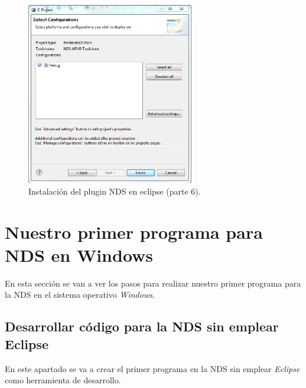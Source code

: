 \newpage

\begin{figure}[h]
\centering
\includegraphics[height=8cm]{./Figuras/C2/c2_instalar_windows8.png}
\caption{Instalación del plugin NDS en eclipse (parte 6).}
\label{fig_c2_win8}
\end{figure}


\section{Nuestro primer programa para NDS en Windows}
En esta sección se van a ver los pasos para realizar nuestro primer programa para la NDS en el sistema operativo \textit{Windows}. 


\subsection{Desarrollar código para la NDS sin emplear Eclipse}
\label{sec:programa}
En este apartado se va a crear el primer programa en la NDS sin emplear \textit{Eclipse} como herramienta de desarrollo.

